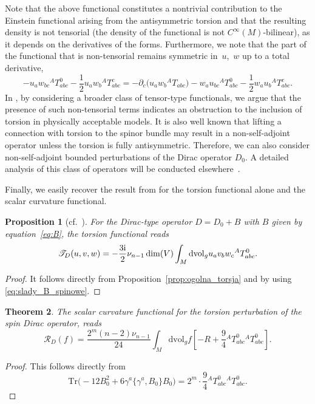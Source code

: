 \documentclass[pdftex]{sigma}
\numberwithin{equation}{section}
\newtheorem{Theorem}{Theorem}[section]
\newtheorem{Proposition}[Theorem]{Proposition}
\theoremstyle{definition}
\def\Tr{\mathrm{Tr}}
\def\dv{\mathrm{dvol}_g}
\begin{document}
Note that the above functional constitutes a nontrivial contribution to the Einstein functional arising from the antisymmetric torsion and that the resulting density is not tensorial (the density of the functional is not $C^\infty(M)$-bilinear), as it depends on the derivatives of the forms. Furthermore, we note that the part of the functional that is non-tensorial remains symmetric in~$u$,~$w$ up to a total derivative,
\[
 - u_a w_{bc}{}^AT^{0}_{abc} - \frac{1}{2} u_a w_{b} {}^AT^{c}_{abc}
= - \partial_c \bigl( u_a w_{b}{}^AT_{abc} \bigr)
 - w_a u_{bc}{}^AT^{0}_{abc} - \frac{1}{2} w_a u_{b} {}^AT^{c}_{abc}.
\]
In \cite{bochniak2025}, by considering a broader class of tensor-type functionals, we argue that the presence of such non-tensorial terms indicates an obstruction to the inclusion of torsion in physically acceptable models. It is also well known that lifting a connection with torsion to the spinor bundle may result in a non-self-adjoint operator unless the torsion is fully antisymmetric. Therefore, we can also consider non-self-adjoint bounded perturbations of the Dirac operator $D_0$. A detailed analysis of this class of operators will be conducted elsewhere~\cite{to_appear}.

Finally, we easily recover the result from \cite{dabrowski2024} for the torsion functional alone and the scalar curvature functional.
\begin{Proposition}[{cf.\ \cite[Theorem~2.2]{dabrowski2024}}]
	For the Dirac-type operator $D=D_0+B$ with $B$ given by equation~\eqref{eq:B}, the torsion functional reads
	\[
		\mathscr{T}_D(u,v,w)= -\frac{3{\rm i}}{2}\nu_{n-1}\dim(V)\int_M \dv u_{a}v_bw_c {}^AT^{0}_{abc}.
	\]
\end{Proposition}
\begin{proof}
It follows directly from Proposition~\ref{prop:ogolna_torsja} and by using \eqref{eq:slady_B_spinowe}.
\end{proof}

\begin{Theorem}\label{EH-spinD}
The scalar curvature functional for the torsion perturbation of the spin Dirac operator,
 reads
\[
	\mathscr{R}_D(f)=\frac{2^m(n-2)\nu_{n-1}}{24}\int_M \dv f \left[-R+\frac{9}{4}{}^AT_{abc}^0{}^AT_{abc}^0\right].
\]
\end{Theorem}
\begin{proof}
This follows directly from
\[
	\Tr\bigl(-12 B_0^2 +6\gamma^a\{\gamma^a, B_0\}B_0\bigr)=2^m \cdot \frac{9}{4} {}^AT_{abc}^0 {}^AT_{abc}^0.\tag*{\qed}
\]\renewcommand{\qed}{}
\end{proof}
\end{document}
